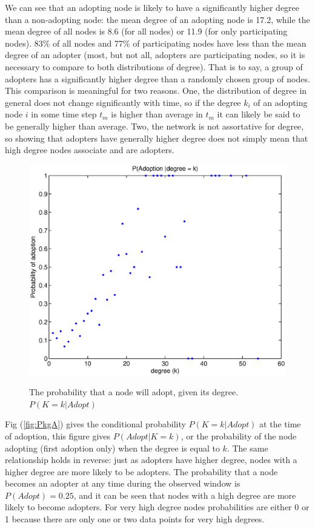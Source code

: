 \documentclass[12pt]{article}
\begin{document}
We can see that an adopting node is likely to have a significantly higher degree than a non-adopting node: the mean degree of an adopting node is 17.2, while the mean degree of all nodes is 8.6 (for all nodes) or 11.9 (for only participating nodes). 83\% of all nodes and 77\% of participating nodes have less than the mean degree of an adopter (most, but not all,  adopters are participating nodes, so it is necessary to compare to both distributions of degree). That is to say, a group of adopters has a significantly higher degree than a randomly chosen group of nodes. \newline This comparison is meaningful for two reasons. One, the distribution of degree in general does not change significantly with time, so if the degree \(k_i\) of an adopting node \(i\) in some time step \(t_m\) is higher than average in \(t_m\) it can likely be said to be generally higher than average. Two, the network is not assortative for degree, so showing that adopters have generally higher degree does not simply mean that high degree nodes associate and are adopters.

\begin{figure}[H]
\includegraphics[trim = 0cm 0cm 0cm 0cm, width = .9\textwidth]{Graficos/ProbAgk.eps}
\label{fig:ProbAgk}
\caption{The probability that a node will adopt, given its degree. \(P(K = k | Adopt)\) }
\end{figure}

Fig (\ref{fig:PkgA}) gives the conditional probability \(P(K = k | Adopt)\) at the time of adoption, this figure gives \(P(Adopt | K = k)\), or the probability of the node adopting (first adoption only) when the degree is equal to \(k\). The same relationship holds in reverse: just as adopters have higher degree, nodes with a higher degree are more likely to be adopters. The probability that a node becomes an adopter at any time during the observed window is \(P(Adopt) = 0.25\), and it can be seen that nodes with a high degree are more likely to become adopters. For very high degree nodes probabilities are either 0 or 1 because there are only one or two data points for very high degrees.
\end{document}
